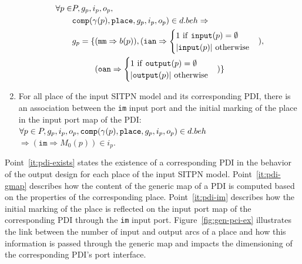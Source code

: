 \begin{definition}
\begin{enumerate}[resume]
    \begin{equation*}
      \begin{aligned}
        \forall{}p\in&{}P,g_p,i_p,o_p, \\
        & \mathtt{comp}(\gamma(p),\mathtt{place},g_p,i_p,o_p)\in{}d.beh\Rightarrow \\
        &
          \begin{aligned}
            g_p=\{&(\mathtt{mm}\Rightarrow{}b(p)), (\mathtt{ian}\Rightarrow
            \begin{cases}
              1~\mathrm{if}~\mathtt{input}(p)=\emptyset \\
              \vert{}\mathtt{input}(p)\vert~\mathrm{otherwise} \\
            \end{cases}), \\
            &(\mathtt{oan}\Rightarrow
            \begin{cases}
              1~\mathrm{if}~\mathtt{output}(p)=\emptyset \\
              \vert{}\mathtt{output}(p)\vert~\mathrm{otherwise} \\
            \end{cases})\} \\
          \end{aligned}
        \\
      \end{aligned}
    \end{equation*}
    
  \item\label{it:pdi-im} For all place of the input SITPN model and
    its corresponding PDI, there is an association between the
    \texttt{im} input port and the initial marking of the place in the
    input port map of the PDI:\\
    $\forall{}p\in{}P,g_p,i_p,o_p,\mathtt{comp}(\gamma(p),\mathtt{place},g_p,i_p,o_p)\in{}d.beh{}$
    $\Rightarrow(\mathtt{im}\Rightarrow{}M_0(p))\in{}i_p$.
  \end{enumerate}

  \bigskip

  Point~\ref{it:pdi-exists} states the existence of a corresponding
  PDI in the behavior of the output design for each place of the input
  SITPN model. Point~\ref{it:pdi-gmap} describes how the content of
  the generic map of a PDI is computed based on the properties of the
  corresponding place. Point~\ref{it:pdi-im} describes how the initial
  marking of the place is reflected on the input port map of the
  corresponding PDI through the \texttt{im} input
  port. Figure~\ref{fig:gen-pci-ex} illustrates the link between the
  number of input and output arcs of a place and how this information
  is passed through the generic map and impacts the dimensioning of
  the corresponding PDI's port interface.


\end{definition}
